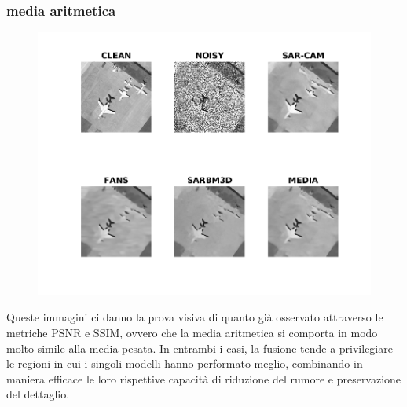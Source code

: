 \subsubsection{media aritmetica}
\begin{figure}[H] 
    \centering
    \includegraphics[width=1.1\textwidth]{utils/MNairplane00.png}
    \caption{}
    \label{fig:airplane00MN}
  \end{figure}
  Queste immagini ci danno la prova visiva di quanto già osservato attraverso le metriche PSNR e SSIM, ovvero che 
  la media aritmetica si comporta in modo molto simile alla media pesata. In entrambi i casi, la fusione tende a 
  privilegiare le regioni in cui i singoli modelli hanno performato meglio, combinando in maniera efficace le 
  loro rispettive capacità di riduzione del rumore e preservazione del dettaglio.